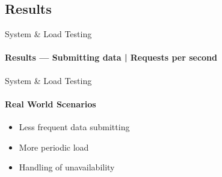 \subsection{Results}
\begin{frame}[fragile]{System \& Load Testing}
        \framesubtitle{Results --- Submitting data | Requests per second}
\end{frame}

\begin{frame}{System \& Load Testing}
        \framesubtitle{Real World Scenarios}
        \begin{itemize}
            \item<1-> Less frequent data submitting
            \item<1-> More periodic load
            \item<1-> Handling of unavailability
        \end{itemize}
\end{frame}
